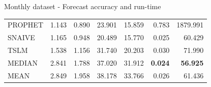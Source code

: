 \documentclass[aspectratio=169]{beamer}
\begin{document}
\begin{frame}[t]{Monthly dataset - Forecast accuracy and run-time}
\begin{minipage}[t]{0.7\textwidth}
\begin{table}[ht]
\begin{tabular}{lrrrrrr}
				PROPHET & 1.143 & 0.890 & 23.901 & 15.859 & 0.783 & 1879.991 \\ 
				SNAIVE & 1.165 & 0.948 & 20.489 & 15.770 & 0.025 & 60.429 \\ 
				TSLM & 1.538 & 1.156 & 31.740 & 20.203 & 0.030 & 71.990 \\ 
				MEDIAN & 2.841 & 1.788 & 37.020 & 31.912 & \textbf{0.024} & \textbf{56.925} \\ 
				MEAN & 2.849 & 1.958 & 38.178 & 33.766 & 0.026 & 61.436 \\ 
				\bottomrule
			\end{tabular}
		\end{table}
    \end{minipage}
\end{frame}
\end{document}
